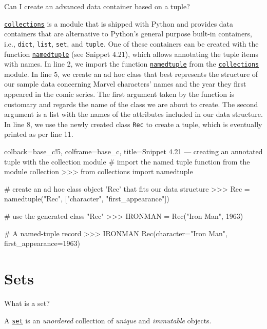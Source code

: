\documentclass[a4paper,11pt]{book}
\newcommand{\question}[1]{%
    \begin{tcolorbox}[colback=comp_c!10,colframe=comp_c,sidebyside align=top,width=\linewidth,before skip=1ex]
        #1
    \end{tcolorbox}
    \switchcolumn%
}
\newcommand{\note}[1]{%
    \begin{tcolorbox}[colback=white!0,colframe=white!10,width=\linewidth,before skip=1ex]
        #1
    \end{tcolorbox}
}
\begin{document}
\begin{paracol}{2}
	\question{\raggedright Can I create an advanced data container based on a tuple?}
	\note{\href{https://docs.python.org/3/library/collections.html}{\texttt{collections}} is a module that is shipped with Python and provides data containers that are alternative to Python's general purpose built-in containers, i.e., \texttt{dict}, \texttt{list}, \texttt{set}, and \texttt{tuple}. One of these containers can be created with the function \href{https://docs.python.org/3/library/collections.html\#collections.namedtuple}{\texttt{namedtuple}} (see Snippet 4.21), which allows annotating the tuple items with names. In line 2, we import the function \href{https://docs.python.org/3/library/collections.html\#collections.namedtuple}{\texttt{namedtuple}} from the \href{https://docs.python.org/3/library/collections.html\#collections}{\texttt{collections}} module. In line 5, we create an ad hoc class that best represents the structure of our sample data concerning Marvel characters' names and the year they first appeared in the comic series. The first argument taken by the function is customary and regards the name of the class we are about to create. The second argument is a list with the names of the attributes included in our data structure. In line 8, we use the newly created class \texttt{Rec} to create a tuple, which is eventually printed as per line 11.}
\end{paracol}

\begin{pythoncode}[linenos=true,]{colback=base_c!5, colframe=base_c, title=\sffamily Snippet 4.21 --- creating an annotated tuple with the collection module}
# import the named tuple function from the module collection
>>> from collections import namedtuple

# create an ad hoc class object 'Rec' that fits our data structure
>>> Rec = namedtuple("Rec", ["character", "first_appearance"])

# use the generated class "Rec"
>>> IRONMAN = Rec("Iron Man", 1963)

# A named-tuple record
>>> IRONMAN
Rec(character="Iron Man", first_appearance=1963)
\end{pythoncode}

\section{Sets}

\begin{paracol}{2}
	\question{\raggedright What is a set?}
	\note{A \href{https://docs.python.org/3/tutorial/datastructures.html\#sets}{\texttt{set}} is an \emph{unordered} collection of \emph{unique} and \emph{immutable} objects.}
\end{paracol}
\end{document}
